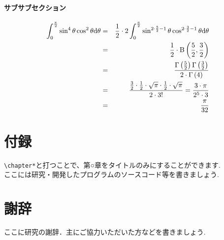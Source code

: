 \documentclass[a4paper,12pt]{jsreport}
\begin{document}
\subsubsection{サブサブセクション}
\begin{eqnarray}
\int^\frac{\pi}{2} _0 \sin^4\theta \cos^2 \theta {\rm d} \theta &=& \frac{1}{2} \cdot 2 \int^\frac{\pi}{2} _0 \sin^{2 \cdot \frac{5}{2} -1}\theta \cos^{2 \cdot \frac{3}{2}-1} \theta {\rm d}\theta\\
&=& \frac{1}{2} \cdot \rm B \left( \frac{5}{2} , \frac{3}{2} \right)\nonumber \\
&=& \frac{\Gamma \left(\frac{5}{2} \right)\Gamma \left(\frac{3}{2} \right)}{2\cdot\Gamma \left( 4 \right)}\\
&=& \frac{\frac{3}{2} \cdot \frac{1}{2} \cdot \sqrt{\pi} \cdot \frac{1}{2} \cdot \sqrt{\pi}}{2 \cdot 3! }  =  \frac{3 \cdot \pi}{2^5 \cdot 3}\nonumber \\
&=& \frac{\pi}{32}
\end{eqnarray}




\chapter*{付録}
\verb+\chapter*+と打つことで、第○章をタイトルのみにすることができます.\\
ここには研究・開発したプログラムのソースコード等を書きましょう.

\chapter*{謝辞}
ここに研究の謝辞．主にご協力いただいた方などを書きましょう.

\end{document}
